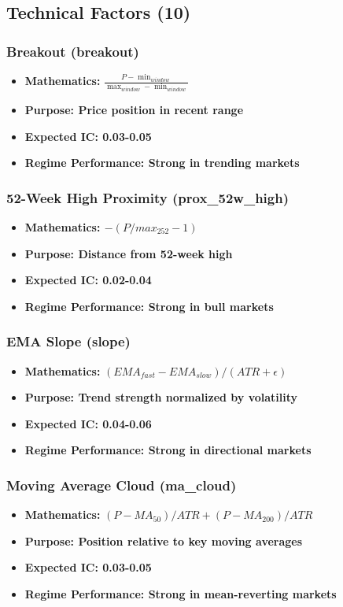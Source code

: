 \documentclass[11pt,letterpaper,openany]{book}
\begin{document}
\subsection{Technical Factors (10)}

\subsubsection{Breakout (breakout)}
\begin{itemize}
    \item \textbf{Mathematics:} $\frac{P - \min_{window}}{\max_{window} - \min_{window}}$
    \item \textbf{Purpose: Price position in recent range}
    \item \textbf{Expected IC: 0.03-0.05}
    \item \textbf{Regime Performance: Strong in trending markets}
\end{itemize}

\subsubsection{52-Week High Proximity (prox\_52w\_high)}
\begin{itemize}
    \item \textbf{Mathematics: $-(P / max_{252} - 1)$}
    \item \textbf{Purpose: Distance from 52-week high}
    \item \textbf{Expected IC: 0.02-0.04}
    \item \textbf{Regime Performance: Strong in bull markets}
\end{itemize}

\subsubsection{EMA Slope (slope)}
\begin{itemize}
    \item \textbf{Mathematics:} $(EMA_{fast} - EMA_{slow}) / (ATR + \epsilon)$
    \item \textbf{Purpose: Trend strength normalized by volatility}
    \item \textbf{Expected IC: 0.04-0.06}
    \item \textbf{Regime Performance: Strong in directional markets}
\end{itemize}

\subsubsection{Moving Average Cloud (ma\_cloud)}
\begin{itemize}
    \item \textbf{Mathematics:} $(P - MA_{50}) / ATR + (P - MA_{200}) / ATR$
    \item \textbf{Purpose: Position relative to key moving averages}
    \item \textbf{Expected IC: 0.03-0.05}
    \item \textbf{Regime Performance: Strong in mean-reverting markets}
\end{itemize}
\end{document}
